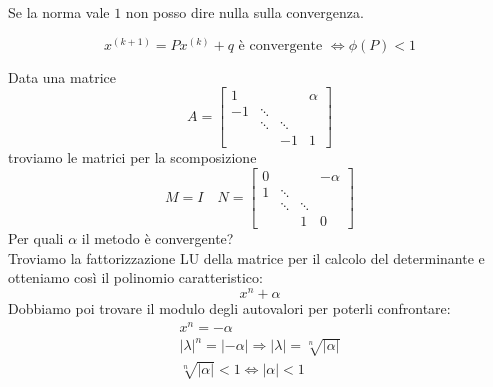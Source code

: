\begin{note}
	Se la norma vale $1$ non posso dire nulla sulla convergenza.
\end{note}

\begin{theorem}
	\begin{equation}
		x^{(k+1)} = Px^{(k)}+q \text{ è convergente } \Leftrightarrow \phi(P)<1
	\end{equation}
\end{theorem}

\begin{example}
		Data una matrice
	\begin{equation*}
		A = \begin{bmatrix}
			1 & & & \alpha\\ 
			-1 & \ddots &  & \\
			& \ddots & \ddots &\\
			& & -1 & 1
		\end{bmatrix}
	\end{equation*}
	troviamo le matrici per la scomposizione
	\begin{equation*}
		M=I \quad
		N = \begin{bmatrix}
			0 & &  & -\alpha\\ 
			1& \ddots & &\\
			 & \ddots & \ddots &\\
			&& 1 & 0
		\end{bmatrix}
	\end{equation*}
	Per quali $\alpha$ il metodo è convergente? \\
	Troviamo la fattorizzazione LU della matrice per il calcolo del determinante e otteniamo così il polinomio caratteristico:
	\begin{equation*}
		x^n + \alpha
	\end{equation*}
	Dobbiamo poi trovare il modulo degli autovalori per poterli confrontare:
	\begin{equation*}
		\begin{split}
			x^n=-\alpha \\
			\lvert\lambda\rvert^n = \lvert -\alpha \rvert \Rightarrow \lvert \lambda \rvert = \sqrt[n]{\lvert \alpha \rvert} \\
			\sqrt[n]{\lvert \alpha \rvert} < 1 \Leftrightarrow \lvert \alpha \rvert < 1
		\end{split}
	\end{equation*}
\end{example}


